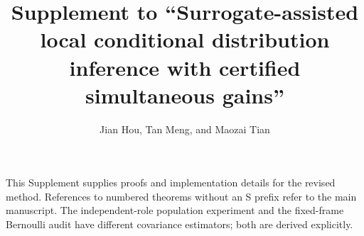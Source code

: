 \documentclass[12pt,a4paper]{article}
\title{Supplement to ``Surrogate-assisted local conditional distribution inference with certified simultaneous gains''}
\author{Jian Hou, Tan Meng, and Maozai Tian}\date{}
\begin{document}
\maketitle
\noindent This Supplement supplies proofs and implementation details for the revised method. References to numbered theorems without an S prefix refer to the main manuscript. The independent-role population experiment and the fixed-frame Bernoulli audit have different covariance estimators; both are derived explicitly.
\tableofcontents











\end{document}
